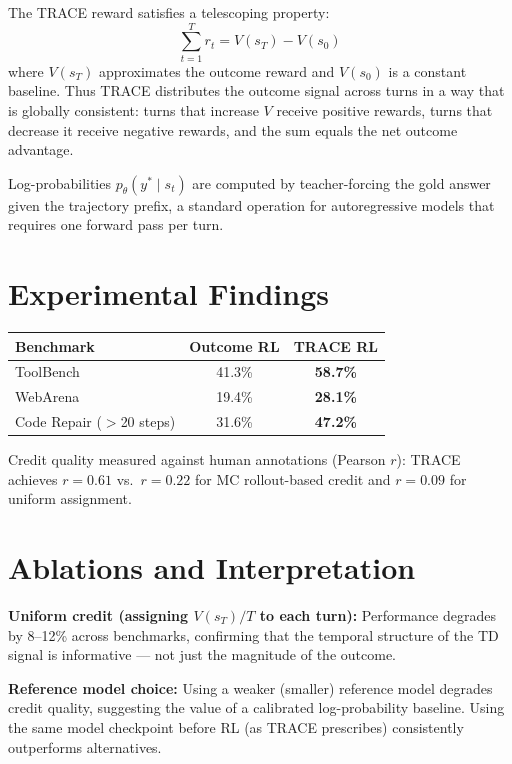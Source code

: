 \documentclass[10pt,twocolumn]{article}
\begin{document}
The TRACE reward satisfies a telescoping property:
\[
\sum_{t=1}^{T} r_t = V(s_T) - V(s_0)
\]
where $V(s_T)$ approximates the outcome reward and $V(s_0)$ is a
constant baseline. Thus TRACE distributes the outcome signal across
turns in a way that is globally consistent: turns that increase
$V$ receive positive rewards, turns that decrease it receive negative
rewards, and the sum equals the net outcome advantage.

Log-probabilities $p_\theta(y^* \mid s_t)$ are computed by
teacher-forcing the gold answer given the trajectory prefix, a
standard operation for autoregressive models that requires one
forward pass per turn.

\section{Experimental Findings}

\begin{center}
\small
\begin{tabular}{lcc}
\toprule
Benchmark & Outcome RL & TRACE RL \\
\midrule
ToolBench & 41.3\% & \textbf{58.7\%} \\
WebArena & 19.4\% & \textbf{28.1\%} \\
Code Repair ($>$20 steps) & 31.6\% & \textbf{47.2\%} \\
\bottomrule
\end{tabular}
\end{center}

Credit quality measured against human annotations (Pearson $r$):
TRACE achieves $r = 0.61$ vs.\ $r = 0.22$ for MC rollout-based
credit and $r = 0.09$ for uniform assignment.

\section{Ablations and Interpretation}

\textbf{Uniform credit (assigning $V(s_T)/T$ to each turn):}
Performance degrades by 8--12\% across benchmarks, confirming
that the temporal structure of the TD signal is informative ---
not just the magnitude of the outcome.

\textbf{Reference model choice:} Using a weaker (smaller) reference
model degrades credit quality, suggesting the value of a calibrated
log-probability baseline. Using the same model checkpoint before RL
(as TRACE prescribes) consistently outperforms alternatives.
\end{document}

